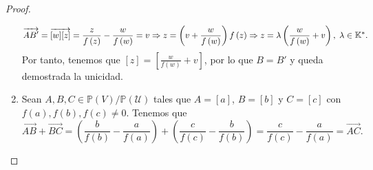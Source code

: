 \begin{proof}
\begin{enumerate}
\[\overrightarrow{AB'} = \overrightarrow{[w][z]} = \frac{z}{f\left(z\right)} - \frac{w}{f\left(w\right)} = v \Rightarrow z = \left(v + \frac{w}{f\left(w\right)}\right)f\left(z\right) \Rightarrow z = \lambda\left(\frac{w}{f\left(w\right)}+v\right), \; \lambda \in \mathbb{K}^{*} .\]
Por tanto, tenemos que $\displaystyle [z] = \left[\frac{w}{f\left(w\right)}+v\right]  $, por lo que $\displaystyle B = B' $ y queda demostrada la unicidad.
\item Sean $\displaystyle A,B,C \in \mathbb{P}\left(V\right) / \mathbb{P}\left(\mathcal{U}\right) $ tales que $\displaystyle A = [a] $, $\displaystyle B = [b] $ y $\displaystyle C = [c] $ con $\displaystyle f\left(a\right), f\left(b\right), f\left(c\right) \neq 0 $. Tenemos que
	\[\overrightarrow{AB}+\overrightarrow{BC} = \left(\frac{b}{f\left(b\right)}-\frac{a}{f\left(a\right)}\right) + \left(\frac{c}{f\left(c\right)} - \frac{b}{f\left(b\right)}\right) = \frac{c}{f\left(c\right)} - \frac{a}{f\left(a\right)} = \overrightarrow{AC} .\]
\end{enumerate}
\end{proof}
